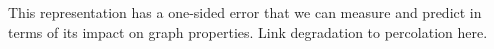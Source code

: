 \documentclass[12pt]{article} \usepackage{simplemargins}
\begin{document}
This representation has a one-sided error that we can measure and
predict in terms of its impact on graph properties.  Link degradation
to percolation here.

\begin{figure}
\end{figure}

\begin{figure}
\end{figure}
\end{document}
